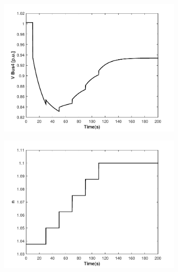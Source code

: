 \documentclass{article}	%
\begin{document}
\begin{figure}[H]
\begin{subfigure}[b]{0.5\textwidth}
    \end{subfigure}
    \begin{subfigure}[b]{0.5\textwidth}
    \includegraphics[width=\textwidth]{vbus4}
    \end{subfigure}
    \begin{subfigure}[b]{0.5\textwidth}
    \includegraphics[width=\textwidth]{n}
    \end{subfigure}
    \begin{subfigure}[b]{0.5\textwidth}

\end{subfigure}
\end{figure}
\end{document}
